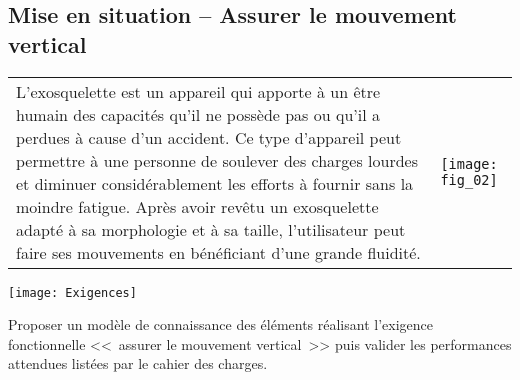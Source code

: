 \setcounter{exo}{0}



\ifprof
\else
\begin{multicols}{2}
\fi

\section*{Mise en situation -- Assurer le mouvement vertical}
\ifprof
\else

\ifprof
\else
\noindent
\begin{tabular}{m{.6\linewidth}m{.3\linewidth}}
L’exosquelette est un appareil qui apporte à un être humain des capacités qu’il ne possède pas ou qu’il a perdues à cause d’un accident. Ce type d’appareil peut permettre à une personne de soulever des charges lourdes et diminuer considérablement les efforts à fournir sans la moindre fatigue. Après avoir revêtu un exosquelette adapté à sa morphologie et à sa taille, l’utilisateur peut faire ses mouvements en bénéficiant
d’une grande fluidité.
& 
\texttt{[image: fig\_02]}

\end{tabular}



\begin{center}
\texttt{[image: Exigences]}
\end{center}
\fi

\fi
\begin{obj}
Proposer un modèle de connaissance des éléments réalisant l’exigence fonctionnelle <<~assurer le mouvement vertical~>> puis valider les performances attendues listées par le cahier des charges.
\end{obj}




\end{multicols}

